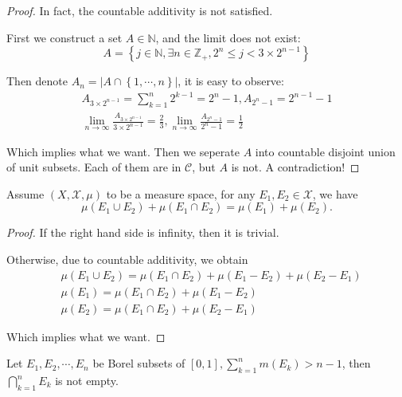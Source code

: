 \begin{proof}
	In fact, the countable additivity is not satisfied.

	First we construct a set $ A\in \mathbb{N}  $, and the limit does not exist:
	$$
		A=\left\{ j\in \mathbb{N},\exists n\in \mathbb{Z}_+,2^n\le j<3\times 2^{n-1} \right\}
	$$

	Then denote $
		A_n=|A\cap \left\{ 1,\cdots ,n \right\} |
	$, it is easy to observe:
	\begin{gather*}
		A_{3\times 2^{n-1}}=\sum_{k=1}^n{2^{k-1}}=2^n-1,A_{2^n-1}=2^{n-1}-1
		\\
		\lim_{n\rightarrow \infty}\frac{A_{3\times 2^{n-1}}}{3\times 2^{n-1}}=\frac{2}{3},
		\lim_{n\rightarrow \infty}\frac{A_{2^n-1}}{2^n-1}=\frac{1}{2}
	\end{gather*}

	Which implies what we want. Then we seperate $ A $ into countable disjoint union
	of unit subsets. Each of them are in $ \mathcal{C}  $, but $ A $ is not.
	A contradiction!
\end{proof}

\begin{problem} \label{pro:capcup}
Assume $ (X,\mathcal{X},\mu ) $ to be a measure space, for any $ E_{1},E_{2} \in \mathcal{X} $, we have
$$
	\mu \left( E_1\cup E_2 \right) +\mu \left( E_1\cap E_2 \right) =\mu \left( E_1 \right) +\mu \left( E_2 \right).
$$
\end{problem}

\begin{proof}
	If the right hand side is infinity, then it is trivial.

	Otherwise, due to countable additivity, we obtain
	\begin{align*}
		 & \mu ( E_1\cup E_2 ) =\mu ( E_1\cap E_2 ) +\mu ( E_1-E_2 ) +\mu ( E_2-E_1 ) \\
		 & \mu ( E_1 ) =\mu ( E_1\cap E_2 ) +\mu ( E_1-E_2 )                                     \\
		 & \mu ( E_2 ) =\mu ( E_1\cap E_2 ) +\mu ( E_2-E_1 )
	\end{align*}

	Which implies what we want.
\end{proof}

\begin{problem}
Let $ E_{1},E_{2},\cdots,E_{n} $ be Borel subsets of $ [0,1],\sum_{k=1}^n{m( E_k )}>n-1 $, then $
	\bigcap_{k=1}^n{E_k}
$ is not empty.
\end{problem}


